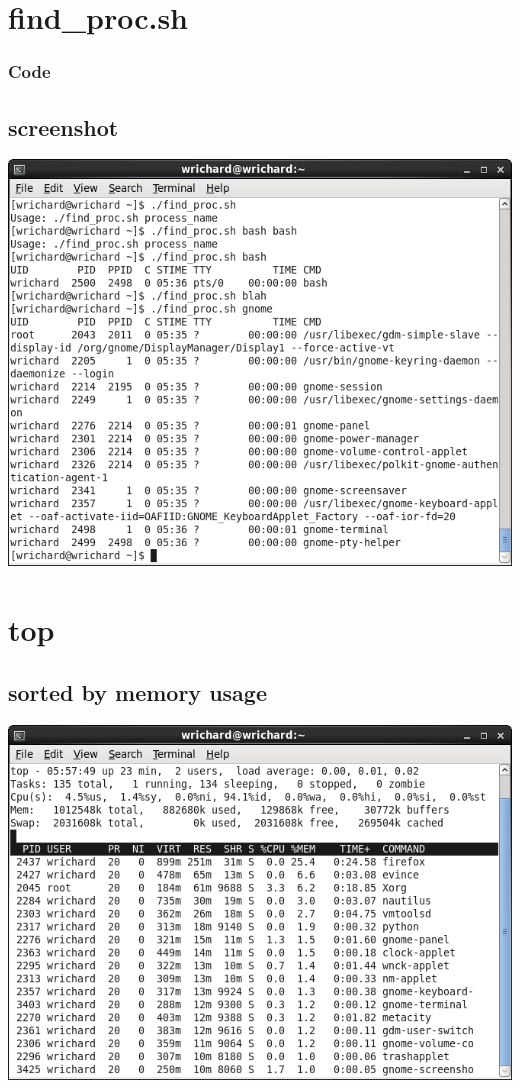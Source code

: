 \documentclass[a4paper,10pt]{article}
\begin{document}
\section{find\_proc.sh}
\subsubsection{Code}

\subsection{screenshot}
  \begin{center}
  \includegraphics[width=\linewidth]{./find_proc.png}
  \end{center}

\section{top}
\subsection{sorted by memory usage}
  \begin{center}
  \includegraphics[width=\linewidth]{./topm.png}
  \end{center}
\end{document}
